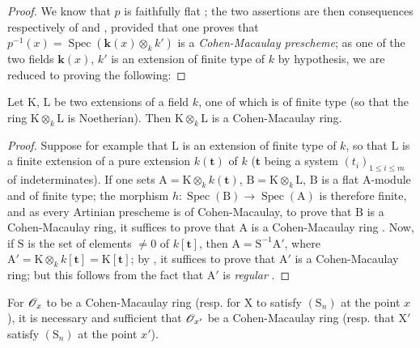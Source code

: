 \begin{proof}
We know that $p$ is faithfully flat ; the two assertions are then consequences respectively of  and , provided that one proves that $p^{-1}(x)=\operatorname{Spec}(\boldsymbol{k}(x)\otimes_k k')$ is a \emph{Cohen-Macaulay prescheme}; as one of the two fields $\boldsymbol{k}(x)$, $k'$ is an extension of finite type of $k$ by hypothesis, we are reduced to proving the following:
\end{proof}

\begin{lemma}[6.7.1.1]
\label{IV.6.7.1.1}
Let $\mathrm{K}$, $\mathrm{L}$ be two extensions of a field $k$, one of which is of finite type (so that the ring $\mathrm{K}\otimes_k\mathrm{L}$ is Noetherian). Then $\mathrm{K}\otimes_k\mathrm{L}$ is a Cohen-Macaulay ring.
\end{lemma}

\begin{proof}
Suppose for example that $\mathrm{L}$ is an extension of finite type of $k$, so that $\mathrm{L}$ is a finite extension of a pure extension $k(\mathbf{t})$ of $k$ ($\mathbf{t}$ being a system $(t_i)_{1\leqslant i\leqslant m}$ of indeterminates). If one sets $\mathrm{A}=\mathrm{K}\otimes_k k(\mathbf{t})$, $\mathrm{B}=\mathrm{K}\otimes_k\mathrm{L}$, $\mathrm{B}$ is a flat $\mathrm{A}$-module  and of finite type; the morphism $h:\operatorname{Spec}(\mathrm{B})\to\operatorname{Spec}(\mathrm{A})$ is therefore finite, and as every Artinian prescheme is of Cohen-Macaulay, to prove that $\mathrm{B}$ is a Cohen-Macaulay ring, it suffices to prove that $\mathrm{A}$ is a Cohen-Macaulay ring . Now, if $\mathrm{S}$ is the set of elements $\neq 0$ of $k[\mathbf{t}]$, then $\mathrm{A}=\mathrm{S}^{-1}\mathrm{A}'$, where $\mathrm{A}'=\mathrm{K}\otimes_k k[\mathbf{t}]=\mathrm{K}[\mathbf{t}]$; by , it suffices to prove that $\mathrm{A}'$ is a Cohen-Macaulay ring; but this follows from the fact that $\mathrm{A}'$ is \emph{regular} .
\end{proof}

\begin{corollary}[6.7.2]
\label{IV.6.7.2}
For $\mathscr{O}_x$ to be a Cohen-Macaulay ring \textup{(resp.} for $\mathrm{X}$ to satisfy $(\mathrm{S}_n)$ at the point $x$), it is necessary and sufficient that $\mathscr{O}_{x'}$ be a Cohen-Macaulay ring \textup{(resp.} that $\mathrm{X}'$ satisfy $(\mathrm{S}_n)$ at the point $x'$).
\end{corollary}

